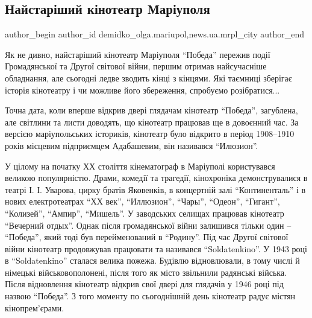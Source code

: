  
 
 
 
 
 
\subsection{Найстаріший кінотеатр Маріуполя}
\label{sec:27_03_2018.stz.news.ua.mrpl_city.1.najstarishyj_kinoteatr}
 
\ifcmt
 author_begin
   author_id demidko_olga.mariupol,news.ua.mrpl_city
 author_end
\fi


Як не дивно, найстаріший кінотеатр Маріуполя \enquote{Победа} пережив події
Громадянської та Другої світової війни, першим отримав найсучасніше
обладнання, але сьогодні ледве зводить кінці з кінцями. Які таємниці зберігає
історія кінотеатру і чи можливе його збереження, спробуємо розібратися...


Точна дата, коли вперше відкрив двері глядачам кінотеатр \enquote{Победа}, загублена,
але світлини та листи доводять, що кінотеатр працював ще в довоєнний час. За
версією маріупольських істориків, кінотеатр було відкрито в період 1908–1910
років місцевим підприємцем Адабашевим, він називався \enquote{Илюзион}.

У цілому на початку ХХ століття кінематограф в Маріуполі користувався великою
популярністю. Драми, комедії та трагедії, кінохроніка демонструвалися в театрі
І. І. Уварова, цирку братів Яковенків, в концертній залі \enquote{Континенталь}
і в нових електротеатрах \enquote{ХХ век}, \enquote{Иллюзион},  \enquote{Чары},
\enquote{Одеон}, \enquote{Гигант}, \enquote{Колизей}, \enquote{Ампир},
\enquote{Мишель}. У заводських селищах працював кінотеатр \enquote{Вечерний
отдых}. Однак після громадянської війни залишився тільки один –
\enquote{Победа}, який тоді був перейменований в \enquote{Родину}. Під час
Другої світової війни кінотеатр продовжував працювати та називався
\enquote{Soldatenkino}. У 1943 році в \enquote{Soldatenkino} сталася велика
пожежа. Будівлю відновлювали, в тому числі й німецькі військовополонені, після
того як місто звільнили радянські війська. Після відновлення кінотеатр відкрив
свої двері для глядачів у 1946 році під назвою \enquote{Победа}. З того моменту
по сьогоднішній день кінотеатр радує містян кінопрем'єрами.

